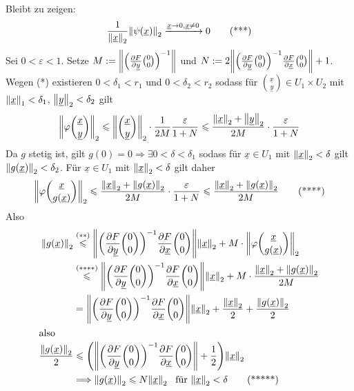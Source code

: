 Bleibt zu zeigen: 
\[
	\frac{1}{\norm[2]{\underline{x}} } \norm[2]{\psi(\underline{x})} \xrightarrow{\underline{x} \to 0, \underline{x} \not=0} 0  \tag{***}
\]
Sei $0 < \varepsilon<1$. Setze $M:= \norm{\enbrace*{\diff{F}{\underline{y}} \binom{0}{0}}^{-1}}$ und 
$N:= 2 \norm{\enbrace*{\diff{F}{\underline{y}} \binom{0}{0}}^{-1} \diff{F}{\underline{x}} \binom{0}{0}} + 1$.\\
Wegen (*) existieren $0< \delta_1 < r_1$ und $0< \delta_2 < r_2$ sodass für $\binom{\underline{x}}{\underline{y}} \in U_1 \times U_2$ mit 
$\norm[1]{\underline{x}} < \delta_1  $, $\norm[2]{\underline{y}} < \delta_2 $ gilt
\begin{align*}
	\norm[2]{\varphi \binom{\underline{x}}{\underline{y}}} \le \norm[2]{\binom{\underline{x}}{\underline{y}}} \cdot \frac{1}{2 M} \frac{\varepsilon}{1+N}   \le
	\frac{\norm[2]{\underline{x}} + \norm[2]{\underline{y}}  }{2 M} \cdot \frac{\varepsilon}{1+N}  
\end{align*}
Da $g$ stetig ist, gilt $g(0) = 0 \Rightarrow \exists 0 < \delta < \delta_1$ sodass für $\underline{x} \in U_1$ mit $\norm[2]{\underline{x}} < \delta  $ gilt
$\norm[2]{g(\underline{x})} < \delta_2 $. Für $\underline{x} \in U_1$ mit $\norm[2]{\underline{x}} < \delta  $ gilt daher 
\[
	\norm[2]{\varphi \binom{\underline{x}}{g(\underline{x})}} \le \frac{\norm[2]{\underline{x}} + \norm[2]{g(\underline{x})}  }{2 M} \cdot \frac{\varepsilon}{1+N}
	\le  \frac{\norm[2]{\underline{x}} + \norm[2]{g(\underline{x})}  }{2M} \tag{****} 
\]
Also
\begin{align*}
	\norm[2]{g(\underline{x})} &\stackrel{(**)}{\le} \norm{ \enbrace*{ \diff{F}{\underline{y}} \binom{0}{0}  }^{-1}  \diff{F}{\underline{x}} \binom{0}{0} } \norm[2]{\underline{x}} +
	M \cdot \norm[2]{\varphi \binom{\underline{x}}{g(\underline{x})}} \\  &\stackrel{(****)}{\le}  
	\norm{ \enbrace*{ \diff{F}{\underline{y}} \binom{0}{0}  }^{-1}  \diff{F}{\underline{x}} \binom{0}{0} } \norm[2]{\underline{x}} + M \cdot \frac{\norm[2]{\underline{x}} + \norm[2]{g(\underline{x})}  }{2M}  \\
	&=  \norm{ \enbrace*{ \diff{F}{\underline{y}} \binom{0}{0}  }^{-1}  \diff{F}{\underline{x}} \binom{0}{0} } \norm[2]{\underline{x}} + \frac{\norm[2]{\underline{x}} }{2}
	+ \frac{\norm[2]{g(\underline{x})} }{2}  \\
	\intertext{also}
	\frac{\norm[2]{g(\underline{x})} }{2} &\le\enbrace*{\norm{ \enbrace*{ \diff{F}{\underline{y}} \binom{0}{0}  }^{-1}  \diff{F}{\underline{x}} \binom{0}{0} } + \frac{1}{2}}
	\norm[2]{\underline{x}}  \\
	&\Longrightarrow \norm[2]{g(\underline{x})} \le N \norm[2]{\underline{x}} \enspace  \text{ für $\norm[2]{\underline{x}} < \delta  $} \tag{*****}
\end{align*}
